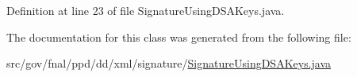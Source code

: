 Definition at line 23 of file Signature\-Using\-D\-S\-A\-Keys.\-java.



The documentation for this class was generated from the following file\-:\begin{DoxyCompactItemize}
\item 
src/gov/fnal/ppd/dd/xml/signature/\hyperlink{SignatureUsingDSAKeys_8java}{Signature\-Using\-D\-S\-A\-Keys.\-java}\end{DoxyCompactItemize}
